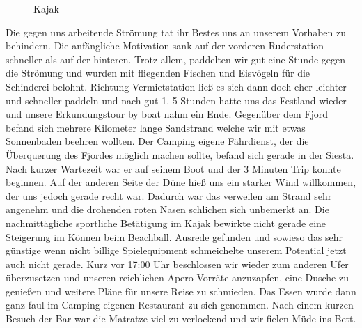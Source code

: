 \begin{figure}[H]
   \centering
   \quad
   \quad
   \quad
   \caption[Kajak]{Kajak}
\end{figure}

Die gegen uns arbeitende Strömung tat ihr Bestes uns an unserem Vorhaben zu behindern.
Die anfängliche Motivation sank auf der vorderen Ruderstation schneller als auf der hinteren.
Trotz allem, paddelten wir gut eine Stunde gegen die Strömung und wurden mit fliegenden Fischen und Eisvögeln für die Schinderei belohnt.
Richtung Vermietstation ließ es sich dann doch eher leichter und schneller paddeln und nach gut 1.
5 Stunden hatte uns das Festland wieder und unsere Erkundungstour by boat nahm ein Ende.
Gegenüber dem Fjord befand sich  mehrere Kilometer lange Sandstrand welche wir mit etwas Sonnenbaden beehren wollten.
Der Camping eigene Fährdienst, der die Überquerung des Fjordes möglich machen sollte, befand sich gerade in der Siesta.
Nach kurzer Wartezeit war er auf seinem Boot und der 3 Minuten Trip konnte beginnen.
Auf der anderen Seite der Düne hieß uns ein starker Wind willkommen, der uns jedoch gerade recht war.
Dadurch war das verweilen am Strand sehr angenehm und die drohenden roten Nasen schlichen sich unbemerkt an.
Die nachmittägliche sportliche Betätigung im Kajak bewirkte nicht gerade eine Steigerung im Können beim Beachball.
Ausrede gefunden und sowieso das sehr günstige wenn nicht billige Spielequipment schmeichelte unserem Potential jetzt auch nicht gerade.
Kurz vor 17:00 Uhr beschlossen wir wieder zum anderen Ufer überzusetzen und unseren reichlichen Apero-Vorräte anzuzapfen, eine Dusche zu genießen und weitere Pläne für unsere Reise zu schmieden.
Das Essen wurde dann ganz faul im Camping eigenen Restaurant zu sich genommen.
Nach einem kurzen Besuch der Bar war die Matratze viel zu verlockend und wir fielen Müde ins Bett.

